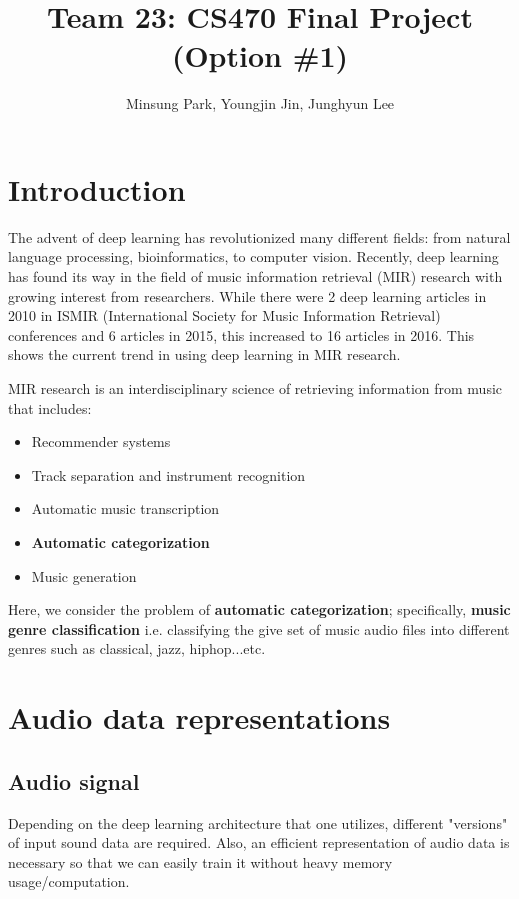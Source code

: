 \documentclass{article}
\title{Team 23: CS470 Final Project (Option \#1)}
\author{Minsung Park, Youngjin Jin, Junghyun Lee}
\theoremstyle{plain}
\theoremstyle{definition}
\theoremstyle{remark}
\begin{document}
\maketitle

\section{Introduction}

	The advent of deep learning has revolutionized many different fields: from natural language processing, bioinformatics, to computer vision.
	Recently, deep learning has found its way in the field of music information retrieval (MIR) research with growing interest from researchers.
	While there were 2 deep learning articles in 2010 in ISMIR (International Society for Music Information Retrieval) conferences and 6 articles in 2015, this increased to 16 articles in 2016. This shows the current trend in using deep learning in MIR research.
	
	MIR research is an interdisciplinary science of retrieving information from music that includes:
\begin{itemize}
	\item Recommender systems
	\item Track separation and instrument recognition
	\item Automatic music transcription
	\item {\bf Automatic categorization}
	\item Music generation
\end{itemize}	
	Here, we consider the problem of {\bf automatic categorization}; specifically, {\bf music genre classification} i.e. classifying the give set of music audio files into different genres such as classical, jazz, hiphop...etc.
	

\section{Audio data representations}

\subsection{Audio signal}
	Depending on the deep learning architecture that one utilizes, different "versions" of input sound data are required.
	Also, an efficient representation of audio data is necessary so that we can easily train it without heavy memory usage/computation.
	
\end{document}
